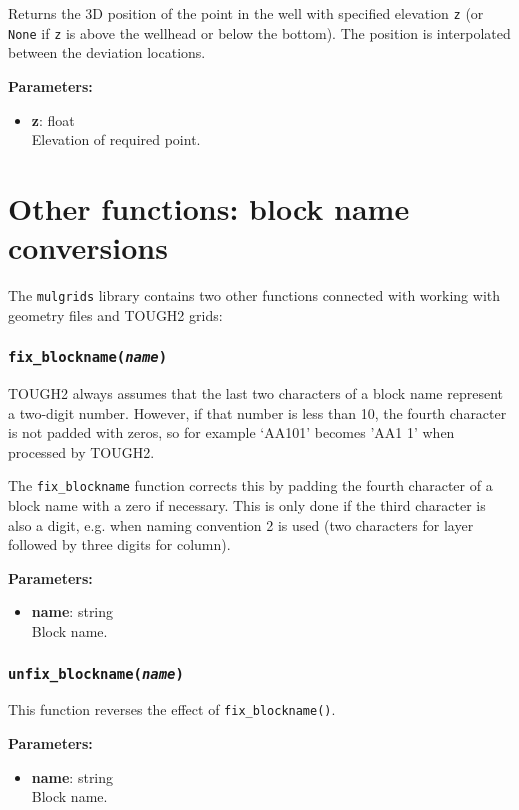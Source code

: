 Returns the 3D position of the point in the well with specified elevation \texttt{z} (or \texttt{None} if \texttt{z} is above the wellhead or below the bottom).  The position is interpolated between the deviation locations.

\textbf{Parameters:}
\begin{itemize}
\item \textbf{z}: float\\
  Elevation of required point.
\end{itemize}

\section{Other functions: block name conversions}

The \texttt{mulgrids} library contains two other functions connected with working with geometry files and TOUGH2 grids:

\subsubsection{\texttt{fix\_blockname(\emph{name})}}

TOUGH2 always assumes that the last two characters of a block name represent a two-digit number.  However, if that number is less than 10, the fourth character is not padded with zeros, so for example `AA101' becomes 'AA1 1' when processed by TOUGH2.

The \texttt{fix\_blockname} function corrects this by padding the fourth character of a block name with a zero if necessary.  This is only done if the third character is also a digit, e.g. when naming convention 2 is used (two characters for layer followed by three digits for column).

\textbf{Parameters:}
\begin{itemize}
\item \textbf{name}: string\\
  Block name.
\end{itemize}

\subsubsection{\texttt{unfix\_blockname(\emph{name})}}

This function reverses the effect of \texttt{fix\_blockname()}.

\textbf{Parameters:}
\begin{itemize}
\item \textbf{name}: string\\
  Block name.
\end{itemize}

